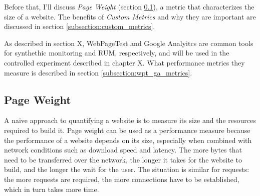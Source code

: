 Before that, I'll discuss \textit{Page Weight} (section \ref{subsection:page_weight}), a metric that characterizes the size of a website.
The benefits of \textit{Custom Metrics} and why they are important are discussed in section \ref{subsection:custom_metrics}.

As described in section X, WebPageTest and Google Analyitcs are common tools for synthethic monitoring and RUM, respectively, and will be used in the controlled experiment described in chapter X.
What performance metrics they measure is described in section \ref{subsection:wpt_ga_metrics}.











\subsection{Page Weight} %
\label{subsection:page_weight}

A naive approach to quantifying a website is to measure its size and the resources required to build it.
Page weight can be used as a performance measure because the performance of a website depends on its size, especially when combined with network conditions such as download speed and latency.
The more bytes that need to be transferred over the network, the longer it takes for the website to build, and the longer the wait for the user.
The situation is similar for requests: the more requests are required, the more connections have to be established, which in turn takes more time.

